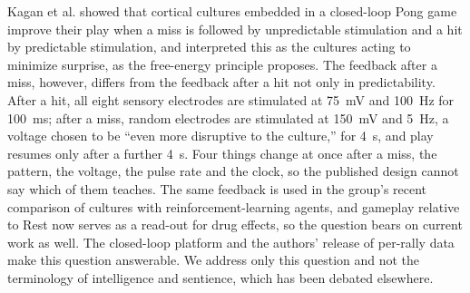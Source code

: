 \documentclass[11pt]{article}
\begin{document}
\par\medskip
{}\par\bigskip
{}\par\smallskip
{}\par\bigskip

Kagan et al.\cite{Kagan2022} showed that cortical cultures embedded in a closed-loop Pong game improve their play when a miss is followed by unpredictable stimulation and a hit by predictable stimulation, and interpreted this as the cultures acting to minimize surprise, as the free-energy principle proposes. The feedback after a miss, however, differs from the feedback after a hit not only in predictability. After a hit, all eight sensory electrodes are stimulated at 75~mV and 100~Hz for 100~ms; after a miss, random electrodes are stimulated at 150~mV and 5~Hz, a voltage chosen to be ``even more disruptive to the culture,''\cite{Kagan2022} for 4~s, and play resumes only after a further 4~s. Four things change at once after a miss, the pattern, the voltage, the pulse rate and the clock, so the published design cannot say which of them teaches. The same feedback is used in the group's recent comparison of cultures with reinforcement-learning agents,\cite{Khajehnejad2025} and gameplay relative to Rest now serves as a read-out for drug effects,\cite{Watmuff2025} so the question bears on current work as well. The closed-loop platform and the authors' release of per-rally data make this question answerable. We address only this question and not the terminology of intelligence and sentience, which has been debated elsewhere.\cite{Balci2023,Kagan2023reply}
\end{document}
